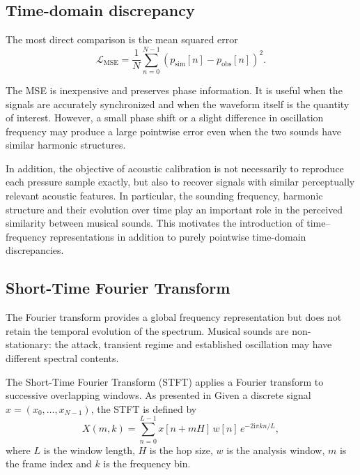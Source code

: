 \documentclass[11pt,a4paper]{report}
\theoremstyle{plain}
\theoremstyle{definition}
\begin{document}
\subsection{Time-domain discrepancy}

The most direct comparison is the mean squared error
\begin{equation}
\mathcal{L}_{\mathrm{MSE}}
=
\frac{1}{N}
\sum_{n=0}^{N-1}
\left(
p_{\mathrm{sim}}[n]
-
p_{\mathrm{obs}}[n]
\right)^2.
\label{eq:mse_loss}
\end{equation}

The MSE is inexpensive and preserves phase information. It is useful when the
signals are accurately synchronized and when the waveform itself is the
quantity of interest. However, a small phase shift or a slight difference in
oscillation frequency may produce a large pointwise error even when the two
sounds have similar harmonic structures.

In addition, the objective of acoustic calibration is not necessarily to
reproduce each pressure sample exactly, but also to recover signals with
similar perceptually relevant acoustic features. In particular, the sounding
frequency, harmonic structure and their evolution over time play an important
role in the perceived similarity between musical sounds. This motivates the
introduction of time--frequency representations in addition to purely
pointwise time-domain discrepancies.

\subsection{Short-Time Fourier Transform}

The Fourier transform provides a global frequency representation but does not
retain the temporal evolution of the spectrum. Musical sounds are
non-stationary: the attack, transient regime and established oscillation may
have different spectral contents.

The Short-Time Fourier Transform (STFT) applies a Fourier transform to
successive overlapping windows. As presented in \cite{allen1977stft} Given a discrete signal
\(x=(x_0,\ldots,x_{N-1})\), the STFT is defined by
\begin{equation}
X(m,k)
=
\sum_{n=0}^{L-1}
x[n+mH]\,
w[n]\,
e^{-2\mathrm{i}\pi kn/L},
\label{eq:stft}
\end{equation}
where \(L\) is the window length, \(H\) is the hop size, \(w\) is the analysis
window, \(m\) is the frame index and \(k\) is the frequency bin.
\end{document}
